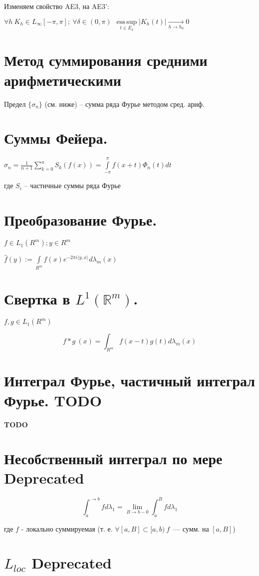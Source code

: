\documentclass[paper=a4, fontsize=17pt]{article}
\DeclareMathOperator*{\esssup}{ess\, sup}
\begin{document}
	Изменяем свойство AE3, на AE3': 
	
	$ \forall h ~ K_h \in L_\infty[-\pi, \pi]; ~ \forall \delta \in (0, \pi) ~ ~ \esssup\limits_{t \in E_\delta} |K_h(t)| \underset{h \rightarrow h_0}{\rightarrow} 0 $
	
\section{Метод суммирования средними арифметическими}
	Предел $ \{\sigma_n\} $ (см. ниже) -- сумма ряда Фурье методом сред. ариф.
\section{Суммы Фейера.}
	$ \sigma_n = \frac{1}{n + 1} \sum\limits_{k=0}^{n} S_k(f(x)) = \int\limits_{-\pi}^{\pi} f(x + t) \Phi_n(t) dt$
	
	где $ S_i $ -- частичные суммы ряда Фурье
\section{Преобразование Фурье.}
	$ f \in L_1(R^m); y \in R^m$
	
	$  \hat{f}(y) := \int\limits_{R^m} f(x)e^{-2\pi i \langle y, x \rangle} d\lambda_m(x) $
\section{Свертка в $L^1(\mathds{R}^m)$.}
	
	$ f, g \in L_1(R^m) $
	
	$$ f \ast g ~ (x) = \int_{R^m} f(x - t) g(t) d\lambda_m(x)$$
	
\section{Интеграл Фурье, частичный интеграл Фурье. TODO}
	{\color{red} \textbf{TODO}}


	\section{Несобственный интеграл по мере \Large Deprecated}

	$$ \int_{a}^{\rightarrow b} f d\lambda_1 = \lim\limits_{B \rightarrow b-0} \int_{a}^{B} f d\lambda_1 $$

	где $ f $ - локально суммируемая (т. е. $ \forall [a, B] \subset [a, b) ~ f $~--- сумм. на $ [a, B] $)

	\section{$ L_{loc} $ \Large Deprecated}
\end{document}
